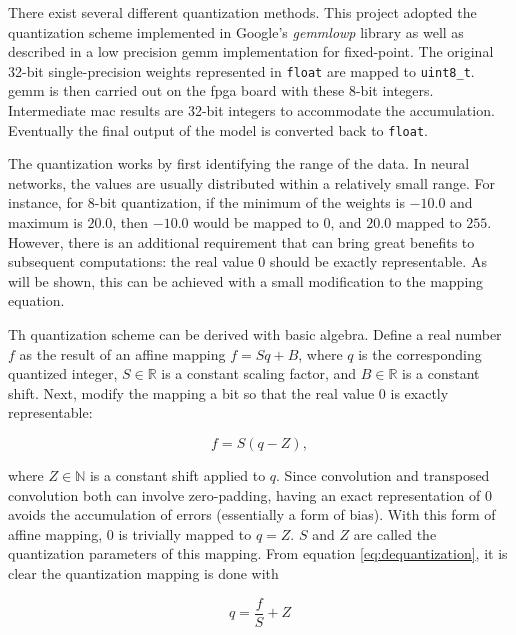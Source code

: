 There exist several different quantization methods. This project adopted the quantization scheme
implemented in Google's \textit{gemmlowp} library \cite{github:gemmlowp}
as well as described in \cite{DBLP:journals/corr/abs-1712-05877}
a low precision \gls{gemm} implementation for fixed-point.
The original 32-bit single-precision weights represented in \texttt{float} are mapped to 
\texttt{uint8_t}. \gls{gemm} is then
carried out on the \gls{fpga} board with these 8-bit integers. Intermediate \gls{mac} results are 32-bit
integers to accommodate the accumulation. Eventually the final output of the model is converted back to
\texttt{float}.

The quantization works by first identifying the range of the data. In neural networks, the values are usually
distributed within a relatively small range. For instance, for 8-bit quantization, if the minimum of the
weights is $-10.0$ and maximum is $20.0$, then $-10.0$ would be mapped to $0$, and $20.0$ mapped to $255$.
However, there is an additional requirement that can bring great benefits to subsequent computations:
the real value $0$ should be exactly representable. As will be shown, this can be achieved with a small
modification to the mapping equation.

Th quantization scheme can be derived with basic algebra. Define a real number $f$ as the result of an affine
mapping $f = S q + B$, where $q$ is the corresponding quantized integer, $S \in \mathbb{R}$ is a constant
scaling factor, and $B \in \mathbb{R}$ is a constant shift. Next, modify the mapping a bit so that the
real value $0$ is exactly representable:

\begin{equation} \label{eq:dequantization}
  f = S(q - Z),
\end{equation}

where $Z \in \mathbb{N}$ is a constant shift applied to $q$. Since convolution and transposed convolution
both can involve zero-padding, having an exact representation of $0$ avoids the accumulation of errors
(essentially a form of bias). With this form of affine mapping, $0$ is trivially mapped to $q = Z$. $S$ and
$Z$ are called the quantization parameters of this mapping. From equation \ref{eq:dequantization},
it is clear the quantization mapping is done with

\begin{equation} \label{eq:quantization}
  q = \frac{f}{S} + Z
\end{equation}

